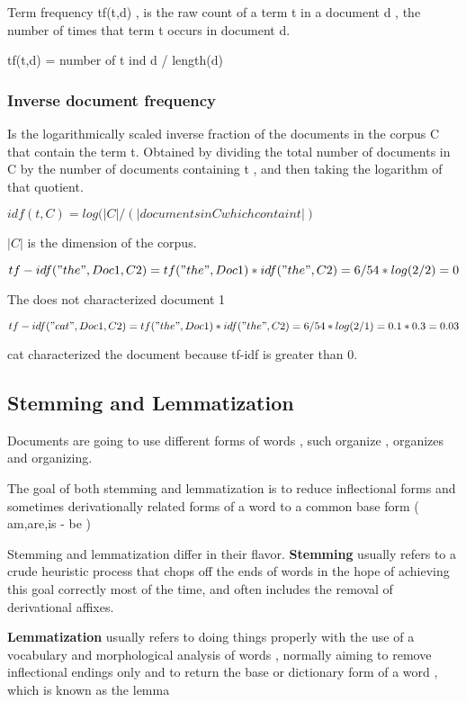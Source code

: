 \documentclass{article}
\begin{document}
Term frequency tf(t,d) , is the raw count of a term t in a document d , the number of times that term t occurs in document d.

tf(t,d) = number of t ind d / length(d)

\subsubsection{Inverse document frequency}

Is the logarithmically scaled inverse fraction of the documents in the corpus C that contain the term t. Obtained by dividing the total number of documents in C by the number of documents containing t , and then taking the logarithm of that quotient.

$idf(t,C) = log(|C| / (|documents in C which contain t|)$

$|C|$ is the dimension of the corpus.

 $tf-idf("the" , Doc1 , C2) = tf("the",Doc1) * idf("the",C2) = 6/54 * log(2/2) = 0$

The does not characterized document 1

 $tf-idf("cat" , Doc1 , C2) = tf("the",Doc1) * idf("the",C2) = 6/54 * log(2/1) = 0.1 * 0.3 = 0.03$

 cat characterized the document because tf-idf is greater than 0.


\subsection{Stemming and Lemmatization}

Documents are going to use different forms of words , such organize , organizes and organizing.

The goal of both stemming and lemmatization is to reduce inflectional forms and sometimes derivationally related forms of a word to a common base form ( am,are,is - be )

Stemming and lemmatization differ in their flavor. \textbf{Stemming} usually refers to a crude heuristic process that chops off the ends of words in the hope of achieving this goal correctly most of the time, and often includes the removal of derivational affixes.

\textbf{Lemmatization} usually refers to doing things properly with the use of a vocabulary and morphological analysis of words , normally aiming to remove inflectional endings only and to return the base or dictionary form of a word , which is known as the lemma
\end{document}

